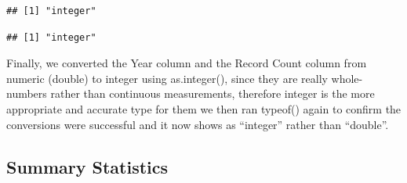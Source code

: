 \documentclass[
]{article}
\newenvironment{Shaded}{\begin{snugshade}}{\end{snugshade}}
\newcommand{\AttributeTok}[1]{\textcolor[rgb]{0.13,0.29,0.53}{#1}}
\newcommand{\FunctionTok}[1]{\textcolor[rgb]{0.13,0.29,0.53}{\textbf{#1}}}
\newcommand{\NormalTok}[1]{#1}
\newcommand{\SpecialCharTok}[1]{\textcolor[rgb]{0.81,0.36,0.00}{\textbf{#1}}}
\newcommand{\StringTok}[1]{\textcolor[rgb]{0.31,0.60,0.02}{#1}}
\begin{document}
\begin{verbatim}
## [1] "integer"
\end{verbatim}

\begin{Shaded}
\end{Shaded}

\begin{verbatim}
## [1] "integer"
\end{verbatim}

Finally, we converted the Year column and the Record Count column from
numeric (double) to integer using as.integer(), since they are really
whole-numbers rather than continuous measurements, therefore integer is
the more appropriate and accurate type for them we then ran typeof()
again to confirm the conversions were successful and it now shows as
``integer'' rather than ``double''.

\subsection{\texorpdfstring{\textbf{Summary Statistics
}}{Summary Statistics }}\label{summary-statistics}
\end{document}
